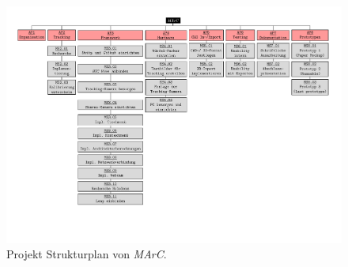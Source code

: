 \begin{figure}[htbp]
	\centering
	\includegraphics[angle=90,scale=.9, trim=1cm 1cm 3.5cm 1 cm]{kapitel/anhang/MP_Strukturplan.pdf}
	 \caption[Projekt Strukturplan von \textit{MArC}]{Projekt Strukturplan von \textit{MArC}.}
	\label{fig:psp}
\end{figure}
\newpage




